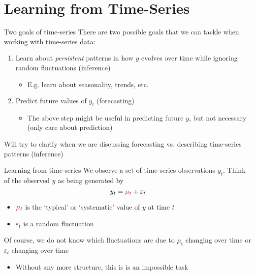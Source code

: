 \documentclass[aspectratio=169,t,11pt,table]{beamer}
\begin{document}
\section{Learning from Time-Series}

\begin{frame}{Two goals of time-series}
  There are two possible goals that we can tackle when working with time-series data:
  \begin{enumerate}
    \item Learn about \emph{persistent} patterns in how $y$ evolves over time while ignoring random fluctuations (inference)
    \begin{itemize}
      \item E.g. learn about seasonality, trends, etc.
    \end{itemize}

    \item Predict future values of $y_t$ (forecasting)
    \begin{itemize}
      \item The above step might be useful in predicting future $y$, but not necessary (only care about prediction)
    \end{itemize}
  \end{enumerate}

  \bigskip
  Will try to clarify when we are discussing forecasting vs. describing time-series patterns (inference)
\end{frame}

\begin{frame}{Learning from time-series}
  We observe a set of time-series observations $y_t$. Think of the observed $y$ as being generated by 
  $$
    y_t = {\color[HTML]{B3114B} \mu_t} + \varepsilon_t
  $$
  \begin{itemize}
    \item ${\color[HTML]{B3114B} \mu_t}$ is the `typical' or `systematic' value of $y$ at time $t$
    
    \item $\varepsilon_t$ is a random fluctuation
  \end{itemize}

  \bigskip
  Of course, we do not know which fluctuations are due to $\mu_t$ changing over time or $\varepsilon_t$ changing over time
  \begin{itemize}
    \item Without any more structure, this is is an impossible task
  \end{itemize}
\end{frame}
\end{document}
